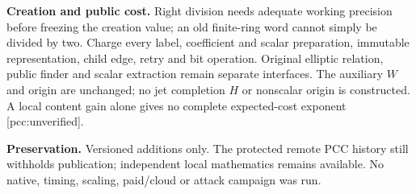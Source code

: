 \documentclass[10pt]{article}
\begin{document}
\textbf{Creation and public cost.} Right division needs adequate working
precision before freezing the creation value; an old finite-ring word
cannot simply be divided by two. Charge every label, coefficient and scalar
preparation, immutable representation, child edge, retry and bit operation.
Original elliptic relation, public finder and scalar extraction remain
separate interfaces. The auxiliary $W$ and origin are unchanged; no jet
completion $H$ or nonscalar origin is constructed. A local content gain
alone gives no complete expected-cost exponent [pcc:unverified].

\textbf{Preservation.} Versioned additions only. The protected remote PCC
history still withholds publication; independent local mathematics remains
available. No native, timing, scaling, paid/cloud or attack campaign was run.
\end{document}

